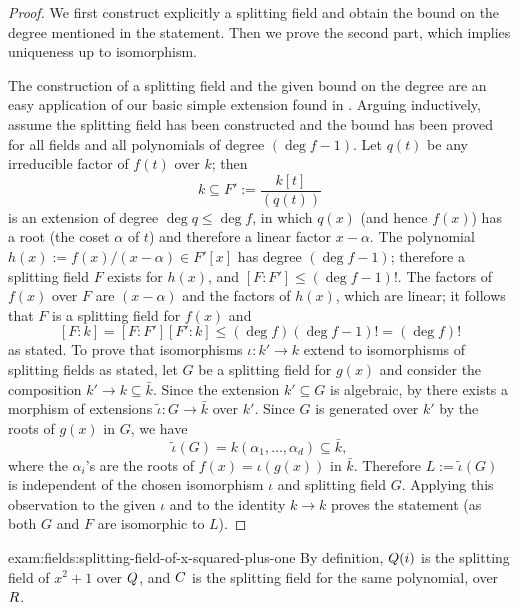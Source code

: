 \begin{proof}
  We first construct explicitly a splitting field and obtain the bound
  on the degree mentioned in the statement. Then we prove the second
  part, which implies uniqueness up to isomorphism.

  The construction of a splitting field and the given bound on the
  degree are an easy application of our basic simple extension found
  in . Arguing inductively, assume the splitting
  field has been constructed and the bound has been proved for all
  fields and all polynomials of degree $(\deg f - 1)$. Let $q(t)$ be
  any irreducible factor of $f(t)$ over $k$; then
  \[
    k \subseteq F' := \frac{k[t]}{(q(t))}
  \]
  is an extension of degree $\deg q \leq \deg f$, in which $q(x)$ (and
  hence $f(x)$) has a root (the coset $\alpha$ of $t$) and therefore a
  linear factor $x - \alpha$. The polynomial
  $h(x) := f(x)/(x - \alpha) \in F'[x]$ has degree $(\deg f - 1)$;
  therefore a splitting field $F$ exists for $h(x)$, and
  $[F : F'] \leq (\deg f - 1)!$. The factors of $f(x)$ over $F$ are
  $(x - \alpha)$ and the factors of $h(x)$, which are linear; it
  follows that $F$ is a splitting field for $f(x)$ and
  \[ [F : k] = [F : F'][F' : k] \leq (\deg f)(\deg f - 1)! = (\deg f)!
  \]
  as stated.  To prove that isomorphisms $\iota : k' \to k$ extend to
  isomorphisms of splitting fields as stated, let $G$ be a splitting
  field for $g(x)$ and consider the composition
  $k' \to k \subseteq \bar{k}$. Since the extension $k' \subseteq G$
  is algebraic, by  there exists a morphism of
  extensions $\tilde\iota : G \to \bar{k}$ over $k'$.  Since $G$ is
  generated over $k'$ by the roots of $g(x)$ in $G$, we have
  \[
    \tilde\iota(G) = k(\alpha_1, \dots, \alpha_d) \subseteq \bar{k},
  \]
  where the $\alpha_i$'s are the roots of $f(x) = \iota(g(x))$ in
  $\bar{k}$. Therefore $L := \tilde\iota(G)$ is independent of the
  chosen isomorphism $\iota$ and splitting field $G$. Applying this
  observation to the given $\iota$ and to the identity $k \to k$
  proves the statement (as both $G$ and $F$ are isomorphic to $L$).
\end{proof}
\begin{exam}{}{exam:fields:splitting-field-of-x-squared-plus-one}
  By definition, $Q(i)$ is the splitting field of $x^2 + 1$ over
  $Q$, and $C$ is the splitting field for the same polynomial, over
  $R$.
\end{exam}
